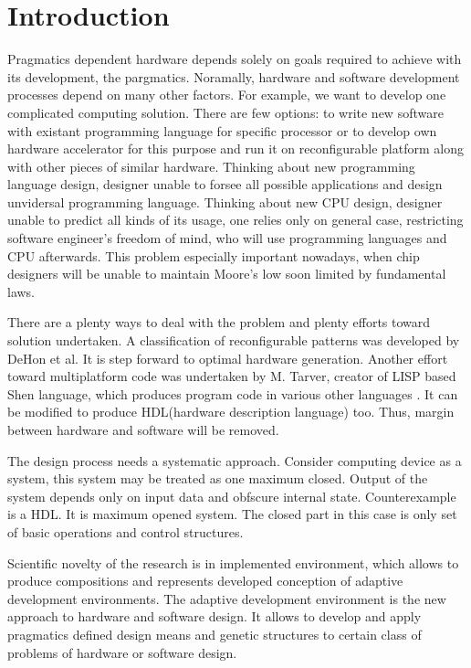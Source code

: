 \section{Introduction}
Pragmatics dependent hardware depends solely on goals required to achieve with its development, the pargmatics. Noramally, hardware and software development processes depend on many other factors. For example, we want to develop one complicated computing solution. There are few options: to write new software with existant programming language for specific processor or to develop own hardware accelerator for this purpose and run it on reconfigurable platform along with other pieces of similar hardware. Thinking about new programming language design, designer unable to forsee all possible applications and design unvidersal programming language. Thinking about new CPU design, designer unable to predict all kinds of its usage, one relies only on general case, restricting software engineer's freedom of mind, who will use programming languages and CPU afterwards. This problem especially important nowadays, when chip designers will be unable to maintain Moore's low soon \cite{mooremaxwell} limited by fundamental laws.

There are a plenty ways to deal with the problem and plenty efforts toward solution undertaken. A classification of reconfigurable patterns was developed by DeHon et al. \cite{reconfigurable_patterns} It is step forward to optimal hardware generation. Another effort toward multiplatform code was undertaken by M. Tarver, creator of LISP based Shen language, which produces program code in various other languages \cite{tarver2013book}. It can be modified to produce HDL(hardware description language) too. Thus, margin between hardware and software will be removed.

The design process needs a systematic approach. Consider computing device as a system, this system may be treated as one maximum closed. Output of the system depends only on input data and obfscure internal state. Counterexample is a HDL. It is maximum opened system. The closed part in this case is only set of basic operations and control structures.

Scientific novelty of the research is in implemented environment, which allows to produce compositions and represents developed conception of adaptive development environments. The adaptive development environment is the new approach to hardware and software design. It allows to develop and apply pragmatics defined design means and genetic structures to certain class of problems of hardware or software design.

